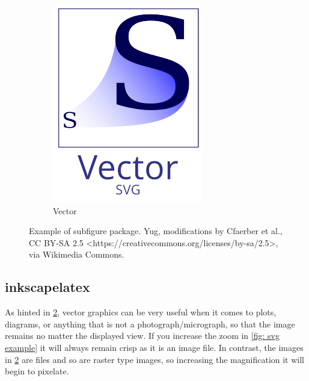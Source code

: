 \begin{figure}[!ht]
\begin{subfigure}[b]{0.3\textwidth}
         \includegraphics[width=\textwidth]{figures/sample/512px-Bitmap_VS_SVG - b.png}
         \caption{Vector}
         \label{fig: subfig vector}
     \end{subfigure}
        \caption{Example of subfigure package. Yug, modifications by Cfaerber et al., CC BY-SA 2.5 <https://creativecommons.org/licenses/by-sa/2.5>, via Wikimedia Commons.}
        \label{fig: subfig example}
\end{figure}

\subsection{inkscapelatex}

As hinted in \cref{fig: subfig example}, vector graphics can be very useful when it comes to plots, diagrams, or anything that is not a photograph/micrograph, so that the image remains  no matter the displayed view.
If you increase the zoom in \cref{fig: svg example} it will always remain crisp as it is an  image file. In contrast, the images in \cref{fig: subfig example} are  files and so are raster type images, so increasing the magnification it will begin to pixelate.

